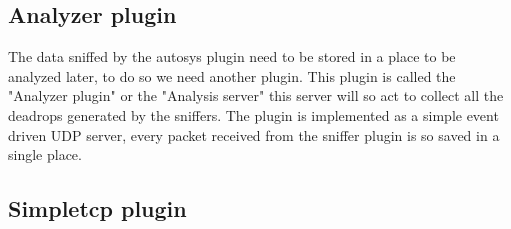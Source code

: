 \subsection{Analyzer plugin}
The data sniffed by the autosys plugin need to be stored in a place to be
analyzed later, to do so we need another plugin.
This plugin is called the "Analyzer plugin" or the "Analysis server" this server
will so act to collect all the deadrops generated by the sniffers.
The plugin is implemented as a simple event driven UDP server, every packet
received from the sniffer plugin is so saved in a single place.

\subsection{Simpletcp plugin}
